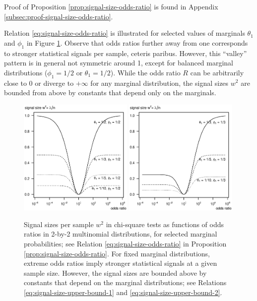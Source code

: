 Proof of Proposition \ref{prop:signal-size-odds-ratio} is found in Appendix \ref{subsec:proof-signal-size-odds-ratio}. 

Relation \eqref{eq:signal-size-odds-ratio} is illustrated for selected values of marginals $\theta_1$ and $\phi_1$ in Figure \ref{fig:signal-vs-odds}.
Observe that odds ratios further away from one corresponds to stronger statistical signals per sample, ceteris paribus.
However, this ``valley'' pattern is in general not symmetric around 1, except for balanced marginal distributions ($\phi_1=1/2$ or $\theta_1=1/2$).
While the odds ratio $R$ can be arbitrarily close to 0 or diverge to $+\infty$ for any marginal distribution, the signal sizes $w^2$ are bounded from above by constants that depend only on the marginals.

\begin{figure}
      \centering
      \includegraphics[width=0.49\textwidth]{./singal-vs-odds-p05}
      \includegraphics[width=0.49\textwidth]{./singal-vs-odds-p0333}            
      \caption{Signal sizes per sample $w^2$ in chi-square tests as functions of odds ratios in 2-by-2 multinomial distributions, for selected marginal probabilities; see Relation \eqref{eq:signal-size-odds-ratio} in Proposition \ref{prop:signal-size-odds-ratio}.
      For fixed marginal distributions, extreme odds ratios imply stronger statistical signals at a given sample size.
      However, the signal sizes are bounded above by constants that depend on the marginal distributions; see Relations \eqref{eq:signal-size-upper-bound-1} and \eqref{eq:signal-size-upper-bound-2}.
      } 
      \label{fig:signal-vs-odds}
\end{figure}

